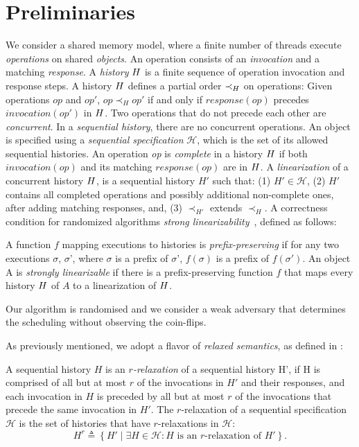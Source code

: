 \chapter{Preliminaries}
\label{chap:prelims}

We consider a shared memory model, where a finite number of threads execute \emph{operations} on shared \emph{objects}. An operation consists of an \emph{invocation} and a matching \emph{response}. A \emph{history} \(\mathnormal{H}\) is a finite sequence of operation invocation and response steps. A history \(\mathnormal{H}\) defines a partial order \(\prec_\mathnormal{H}\) on operations: Given operations \(op\) and \(op'\), \(op \prec_H op'\) if and only if \(response(op)\) precedes \(invocation(op')\) in \(\mathnormal{H}\). Two operations that do not precede each other are \emph{concurrent}. In a \emph{sequential history}, there are no concurrent operations. An object is specified using a \emph{sequential specification} $\mathcal{H}$, which is the set of its allowed sequential histories.
An operation \emph{op} is \emph{complete} in a history \(\mathnormal{H}\) if both \(invocation(op)\) and its matching \(response(op)\) are in \(\mathnormal{H}\).
A \emph{linearization} of a concurrent history \(\mathnormal{H}\), is a sequential history $H'$ such that: (1) $H' \in \mathcal{H}$, (2) $H'$ contains all completed operations and possibly additional non-complete ones, after adding matching responses, and, (3) $\prec_{H'}$ extends $\prec_H$. A correctness condition for randomized algorithms \emph{strong linearizability}~\cite{strong_linearizability}, defined as follows: 

\begin{definition}
\label{def:strong_linearizability}
A function \(f\) mapping executions to histories is \emph{prefix-preserving} if for any two executions $\sigma$, $\sigma$', where $\sigma$ is a prefix of $\sigma$', $f(\sigma)$ is a prefix of $f(\sigma')$. 
An object A is \emph{strongly linearizable} if there is a prefix-preserving function \(f\) that maps every history \(\mathnormal{H}\) of $A$ to a linearization of \(\mathnormal{H}\).
\end{definition}

Our algorithm is randomised and we consider a weak adversary that determines the scheduling without observing the coin-flips.

As previously mentioned, we adopt a flavor of \emph{relaxed semantics}, as defined in \cite{Henzinger_2013_Quantitative_Relaxation}:

\begin{definition}[$r$-relaxation] \label{def:def:r-relaxtion}
A sequential history $H$ is an \emph{$r$-relaxation} of a sequential history H', if H is comprised of all but at most $r$ of the invocations in $H'$ and their responses,
and each invocation in $H$ is preceded by all but at most $r$ of the invocations that precede the same invocation in $H'$.
The $r$-relaxation of a sequential specification $\mathcal{H}$ is the set of histories that have $r$-relaxations in $\mathcal{H}$:
\[{H}^r \triangleq \left\{ H' \mid \exists H \in \mathcal{H}: H \text{ is an } r\text{-relaxation of } H'\right\}. \]
\end{definition}
